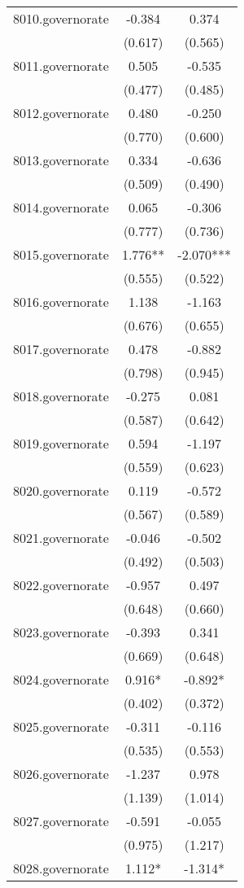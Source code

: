 \documentclass[]{article}
\begin{document}
\begin{tabular}{lcc}
8010.governorate & -0.384 & 0.374 \\
 & (0.617) & (0.565) \\
8011.governorate & 0.505 & -0.535 \\
 & (0.477) & (0.485) \\
8012.governorate & 0.480 & -0.250 \\
 & (0.770) & (0.600) \\
8013.governorate & 0.334 & -0.636 \\
 & (0.509) & (0.490) \\
8014.governorate & 0.065 & -0.306 \\
 & (0.777) & (0.736) \\
8015.governorate & 1.776** & -2.070*** \\
 & (0.555) & (0.522) \\
8016.governorate & 1.138 & -1.163 \\
 & (0.676) & (0.655) \\
8017.governorate & 0.478 & -0.882 \\
 & (0.798) & (0.945) \\
8018.governorate & -0.275 & 0.081 \\
 & (0.587) & (0.642) \\
8019.governorate & 0.594 & -1.197 \\
 & (0.559) & (0.623) \\
8020.governorate & 0.119 & -0.572 \\
 & (0.567) & (0.589) \\
8021.governorate & -0.046 & -0.502 \\
 & (0.492) & (0.503) \\
8022.governorate & -0.957 & 0.497 \\
 & (0.648) & (0.660) \\
8023.governorate & -0.393 & 0.341 \\
 & (0.669) & (0.648) \\
8024.governorate & 0.916* & -0.892* \\
 & (0.402) & (0.372) \\
8025.governorate & -0.311 & -0.116 \\
 & (0.535) & (0.553) \\
8026.governorate & -1.237 & 0.978 \\
 & (1.139) & (1.014) \\
8027.governorate & -0.591 & -0.055 \\
 & (0.975) & (1.217) \\
8028.governorate & 1.112* & -1.314* \\

\end{tabular}
\end{document}
